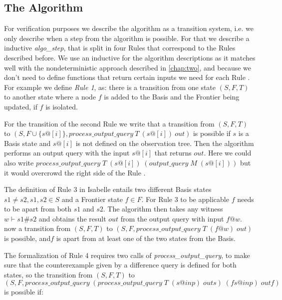 \subsection{The Algorithm}
For verification purposes we describe the algorithm as a transition system, i.e. we only describe when a step from the algorithm is possible. For that we describe a inductive \textit{algo\_step}, that is split in four Rules that correspond to the Rules described before. We use an inductive for the algorithm descriptions as it matches well with the nondeterministic approach described in \autoref{chap:two}, and because we don't need to define functions that return certain inputs we need for each Rule . For example we define \textit{Rule 1}, as: there is a transition from one state $(S,F,T)$ to another state where a node $f$ is added to the Basis and the Frontier being updated, if $f$ is isolated.
\begin{myisabelle}
\end{myisabelle}
For the transition of the second Rule we write that a transition from $(S,F,T)$ to $(S,F\cup\{s@[i]\},process\_output\_query\: T\: (s@[i])\: out)$ is possible if $s$ is a Basis state and $s@[i]$ is not defined on the observation tree. Then the algorithm performs an output query with the input $s@[i]$ that returns $out$. Here we could also write $process\_output\_query\; T\; (s@[i])\; (output\_query\; M\; (s@[i]) )$ but it would overcrowd the right side of the Rule . 
\begin{myisabelle}
\end{myisabelle}
The definition of Rule 3 in Isabelle entails two different Basis states $s1\neq s2, s1,s2\in S$ and a Frontier state $f\in F$. For Rule 3 to be applicable $f$ needs to be apart from both $s1$ and $s2$. The algorithm then takes any witness $w\vdash s1\# s2$ and obtains the result $out$ from the output query with input $f@w$. now a transition from $(S,F,T)$ to $(S,F,process\_output\_query\; T\; (f@w)\; out)$ is possible, and$f$ is apart from at least one of the two states from the Basis. 
\begin{myisabelle}
\end{myisabelle}
The formalization of Rule 4 requires two calls of \textit{process\_output\_query}, to make sure that the counterexample given by a difference query is defined for both states, so the transition from $(S,F,T)$ to \newline$(S,F,process\_output\_query\; (process\_output\_query \; T \; (s@inp)\; outs) \; (fs@inp)\;outf)$ is possible if:
